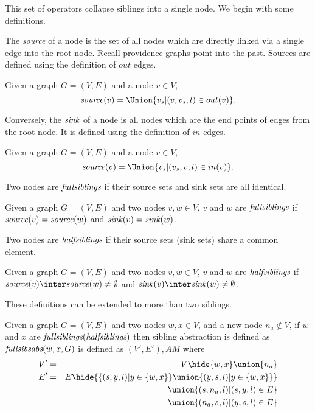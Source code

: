 \documentclass{elsarticle}
\begin{document}
This set of operators collapse siblings into a single node. We begin with some definitions.

The \emph{source} of a node is the set of all nodes which are directly linked via a single edge into the root node.  Recall providence graphs point into the past. Sources are defined using the definition of $out$ edges. 

\begin{definition}[$\source$] \label{def:source}
  Given a graph $G = (V,E)$ and a node $v \in V$,
  \[
  \source(v) = \Union\{v_s|(v,v_s,l) \in out(v)\}.
  \]
\end{definition}

Conversely, the $\sink$ of a node is all nodes which are the end points of edges from the root node.  It is defined using the definition of $in$ edges.

\begin{definition}[$\sink$] \label{def:sink}
  Given a graph $G = (V,E)$ and a node $v \in V$,
  \[
  \source(v) = \Union\{v_s|(v_s,v,l) \in in(v)\}.
  \]
\end{definition}

Two nodes are $\fullsiblings$ if their source sets and sink sets are all identical.  

\begin{definition}[$\fullsiblings$] \label{def:fullsiblings}
  Given a graph $G = (V,E)$ and two nodes $v,w \in V$, $v$ and $w$ are $\fullsiblings$ if $\mathit{source}(v) = \mathit{source}(w)$ and $\mathit{sink}(v) = \mathit{sink}(w)$. 
\end{definition}

Two nodes are $\halfsiblings$ if their source sets (sink sets) share a common element.  

\begin{definition}[$\halfsiblings$] \label{def:halfsiblings}
  Given a graph $G = (V,E)$ and two nodes $v,w \in V$, $v$ and $w$ are $\halfsiblings$ if $\source(v) \inter \source(w) \ne \emptyset$ and $\sink(v) \inter \sink(w) \ne \emptyset$. 
\end{definition}

These definitions can be extended to more than two siblings. 


\begin{definition}[\sibabs]\label{def:sibling-abstraction}
  Given a graph $G = (V,E)$ and two nodes $w,x \in V$, and a new node $n_a \nin V$, if $w$ and $x$ are  $\emph{fullsiblings}(\emph{halfsiblings})$ then sibling abstraction is defined as $\emph{fullsibsabs}(w,x,G)$ is defined as $(V',E'),AM$ where
  \begin{eqnarray*}
    V' &=& V \hide \{w,x\} \union \{n_a\} \\
    E' &=& E\hide \{\{(s,y,l)|  y \in \{w,x\}\} \union \{(y,s,l)| y \in \{w,x\}\}\} \\
    & & \union \{(s,n_a,l)| (s,y,l) \in E\} \\
     & & \union \{(n_a,s,l)| (y,s,l) \in E\} 
  \end{eqnarray*}
\end{definition}
\end{document}
